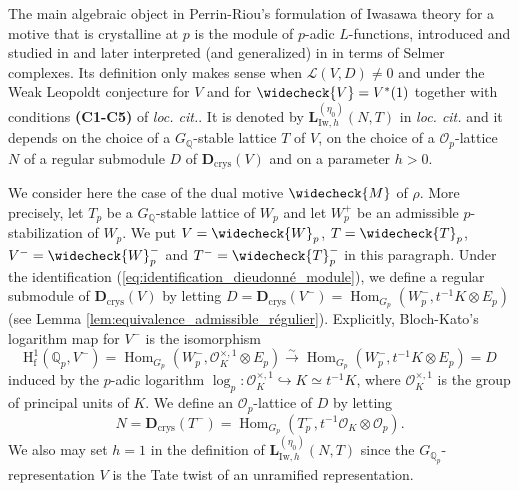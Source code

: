 \documentclass[12pt]{amsart}
\newcommand\bQ{\mathbb{Q}}
\newcommand\Qp{{\mathbb{Q}_p}}
\newcommand\cL{\mathcal{L}}
\newcommand\cO{\mathcal{O}}
\DeclareMathOperator{\Hom}{Hom}
\newcommand{\HH}{\mathrm{H}}
\newcommand{\ff}{\mathrm{f}}
\newcommand{\crys}{\mathrm{crys}}
\newcommand{\Iw}{\mathrm{Iw}}
\theoremstyle{defstyle}
\theoremstyle{thmstyle}
\begin{document}
The main algebraic object in Perrin-Riou's formulation of Iwasawa theory for a motive that is crystalline at $p$ is the module of $p$-adic $L$-functions, introduced and studied in \cite[Chapter 2]{perrin1995fonctions} and later interpreted (and generalized) in \cite[§6.2.3]{benoiscrys} in terms of Selmer complexes. Its definition only makes sense when $\cL(V,D)\neq 0$ and under the Weak Leopoldt conjecture for $V$ and for $\widecheck{V}=V^*(1)$ together with conditions \textbf{(C1-C5)} of \textit{loc. cit.}. It is denoted by $\textbf{L}_{\Iw,h}^{(\eta_0)}(N,T)$ in \textit{loc. cit.} and it depends on the choice of a $G_{\bQ}$-stable lattice $T$ of $V$, on the choice of a $\cO_p$-lattice $N$ of a regular submodule $D$ of $\textbf{D}_\crys(V)$ and on a parameter $h>0$. 

We consider here the case of the dual motive $\widecheck{M}$ of $\rho$. More precisely, let $T_p$ be a $G_{\bQ}$-stable lattice of $W_p$ and let $W_p^+$ be an admissible $p$-stabilization of $W_p$. We put $V=\widecheck{W}_p$, $T=\widecheck{T}_p$, $V^-=\widecheck{W}_p^-$ and $T^-=\widecheck{T}_p^-$ in this paragraph. Under the identification (\ref{eq:identification_dieudonné_module}), we define a regular submodule of $\textbf{D}_\crys(V)$ by letting $D=\textbf{D}_\crys(V^-)=\Hom_{G_p}(W_p^-,t^{-1}K \otimes E_p)$ (see Lemma \ref{lem:equivalence_admissible_régulier}). Explicitly, Bloch-Kato's logarithm map for $V^-$ is the isomorphism
\begin{equation}\label{eq:log_BK_explicite}
\HH^1_\ff(\Qp,V^-)=\Hom_{G_p}(W_p^-,\cO_{K}^{\times,1} \otimes E_p)\overset{\sim}{\longrightarrow}\Hom_{G_p}(W_p^-,t^{-1} K\otimes E_p)=D
\end{equation}
induced by the $p$-adic logarithm $\log_p : \cO_{K}^{\times,1} \hookrightarrow K\simeq t^{-1}K$, where $\cO_{K}^{\times,1}$ is the group of principal units of $K$. We define an $\cO_p$-lattice of $D$ by letting
$$N=\textbf{D}_\crys(T^-)=\Hom_{G_p}(T_p^-,t^{-1}\cO_K \otimes \cO_p).$$
We also may set $h=1$ in the definition of  $\textbf{L}_{\Iw,h}^{(\eta_0)}(N,T)$ since the $G_{\Qp}$-representation $V$ is the Tate twist of an unramified representation.
\end{document}

